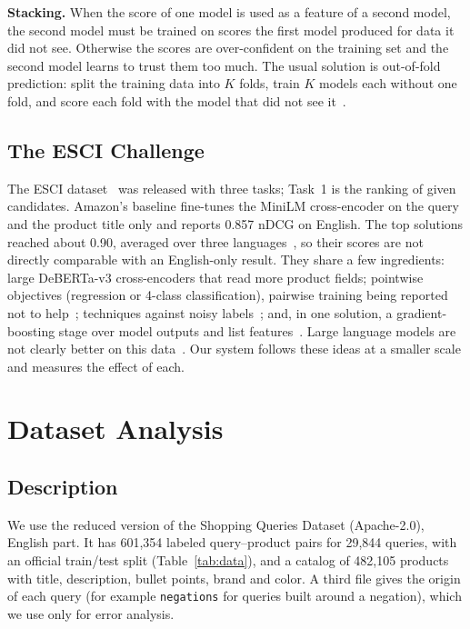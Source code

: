 \documentclass[12pt,a4paper]{report}
\begin{document}
\textbf{Stacking.} When the score of one model is used as a feature of a second model, the second model must be trained on scores the first model produced for data it did not see. Otherwise the scores are over-confident on the training set and the second model learns to trust them too much. The usual solution is out-of-fold prediction: split the training data into $K$ folds, train $K$ models each without one fold, and score each fold with the model that did not see it~\cite{stacking}.

\section{The ESCI Challenge}\label{sec:esci}
The ESCI dataset~\cite{esci} was released with three tasks; Task~1 is the ranking of given candidates. Amazon's baseline fine-tunes the MiniLM cross-encoder on the query and the product title only and reports 0.857 nDCG on English. The top solutions reached about 0.90, averaged over three languages~\cite{top1,second,zhichun,practice}, so their scores are not directly comparable with an English-only result. They share a few ingredients: large DeBERTa-v3 cross-encoders that read more product fields; pointwise objectives (regression or 4-class classification), pairwise training being reported not to help~\cite{second}; techniques against noisy labels~\cite{top1,zhichun}; and, in one solution, a gradient-boosting stage over model outputs and list features~\cite{practice}. Large language models are not clearly better on this data~\cite{ebay}. Our system follows these ideas at a smaller scale and measures the effect of each.

\chapter{Dataset Analysis}\label{ch:data}
\section{Description}
We use the reduced version of the Shopping Queries Dataset (Apache-2.0), English part. It has 601,354 labeled query--product pairs for 29,844 queries, with an official train/test split (Table~\ref{tab:data}), and a catalog of 482,105 products with title, description, bullet points, brand and color. A third file gives the origin of each query (for example \texttt{negations} for queries built around a negation), which we use only for error analysis.
\end{document}
